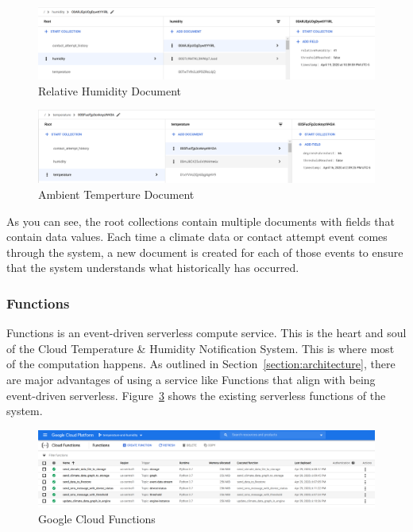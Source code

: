 \documentclass{article}
\begin{document}
\begin{figure}[H]
    \center
    \includegraphics[width=\textwidth]{images/database-humidity.png}
    \caption{Relative Humidity Document}
    \label{fig:humidity}
\end{figure}

\begin{figure}[H]
    \center
    \includegraphics[width=\textwidth]{images/database-temperature.png}
    \caption{Ambient Temperture Document}
    \label{fig:temperature}
\end{figure}

As you can see, the root collections contain multiple documents with fields that contain data values. Each time a climate data or contact attempt event comes through the system, a new document is created for each of those events to ensure that the system understands what historically has occurred.

\subsubsection{Functions}
\label{section:functions}
Functions is an event-driven serverless compute service. This is the heart and soul of the Cloud Temperature \& Humidity Notification System. This is where most of the computation happens. As outlined in Section~\ref{section:architecture}, there are major advantages of using a service like Functions that align with being event-driven serverless. Figure~\ref{fig:functions} shows the existing serverless functions of the system.\\

\begin{figure}[H]
    \center
    \includegraphics[width=\textwidth]{images/functions.png}
    \caption{Google Cloud Functions}
    \label{fig:functions}
\end{figure}
\end{document}

